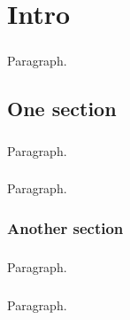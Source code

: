 \chapter{Intro}
\label{cha:intro}
\paragraph{}
Paragraph.

\newpage

\section{One section}
\label{sec:one}
\paragraph{}
Paragraph.

\paragraph{}
Paragraph.

\subsection{Another section}
\paragraph{}
Paragraph.
\paragraph{}
Paragraph.